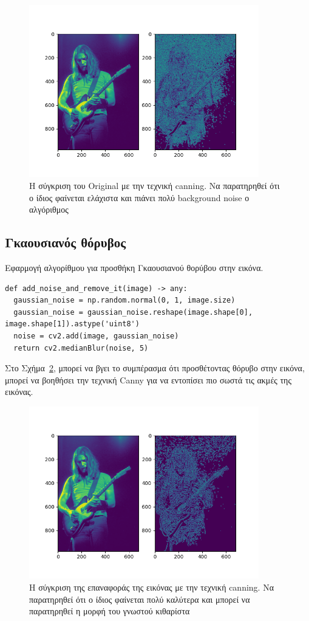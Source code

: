 \begin{figure}[H]
  \centering
  \includegraphics[width=100mm]{Figures/Original}
  \caption[Η σύγκριση του Original με την τεχνική canning]{Η σύγκριση του Original με την τεχνική canning. Να παρατηρηθεί ότι ο ίδιος φαίνεται ελάχιστα και πιάνει πολύ background noise ο αλγόριθμος}
  \label{fig:original}
\end{figure}

\subsection{Γκαουσιανός θόρυβος}

Εφαρμογή αλγορίθμου για προσθήκη Γκαουσιανού θορύβου στην εικόνα.

\begin{verbatim}
def add_noise_and_remove_it(image) -> any:
  gaussian_noise = np.random.normal(0, 1, image.size)
  gaussian_noise = gaussian_noise.reshape(image.shape[0], image.shape[1]).astype('uint8')
  noise = cv2.add(image, gaussian_noise)
  return cv2.medianBlur(noise, 5)
\end{verbatim}

Στο Σχήμα~\ref{fig:restored}, μπορεί να βγει το συμπέρασμα ότι προσθέτοντας θόρυβο στην εικόνα, μπορεί να βοηθήσει την τεχνική Canny για να εντοπίσει πιο σωστά τις ακμές της εικόνας.

\begin{figure}[H]
  \centering
  \includegraphics[width=100mm]{Figures/Restored}
  \caption[Η σύγκριση της επαναφοράς της εικόνας με την τεχνική canning]{Η σύγκριση της επαναφοράς της εικόνας με την τεχνική canning. Να παρατηρηθεί ότι ο ίδιος φαίνεται πολύ καλύτερα και μπορεί να παρατηρηθεί η μορφή του γνωστού κιθαρίστα}
  \label{fig:restored}
\end{figure}

